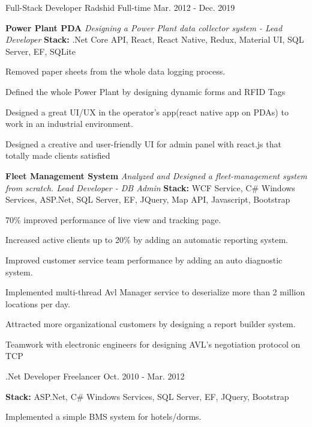 \begin{cventries}
\cventry
{Full-Stack Developer} %
{Radshid} %
{Full-time} %
{Mar. 2012 - Dec. 2019} %
{ %
\textcolor{awesome-red}{{\textbf{Power Plant PDA}}}
\break
{\it Designing a Power Plant data collector system - Lead Developer}
\break
{\textbf{ Stack:} }{.Net Core API, React, React Native, Redux, Material UI, SQL Server, EF, SQLite}
\break
\begin{cvitems}
\item {Removed paper sheets from the whole data logging process.}
\item {Defined the whole Power Plant by designing dynamic forms and RFID Tags}
\item {Designed a great UI/UX in the operator's app(react native app on PDAs) to work in an industrial environment.}
\item {Designed a creative and user-friendly UI for admin panel with react.js that totally made clients satisfied}
\end{cvitems}
\bigskip
\break
\bigskip
\textcolor{awesome-red}{{\textbf{Fleet Management System}}}
\break
{\it Analyzed and Designed a fleet-management system from scratch. Lead Developer - DB Admin}
\break
{\textbf{ Stack:} }{WCF Service, C\# Windows Services, ASP.Net, SQL Server, EF, JQuery, Map API, Javascript, Bootstrap}
\break
\begin{cvitems}
\item {70\% improved performance of live view and tracking page.}
\item {Increased active clients up to 20\% by adding an automatic reporting system.}
\item {Improved customer service team performance by adding an auto diagnostic system.}
\item {Implemented multi-thread Avl Manager service to deserialize more than 2 million locations per day.}
\item {Attracted more organizational customers by designing a report builder system.}
\item {Teamwork with electronic engineers for designing AVL's negotiation protocol on TCP}
\end{cvitems}
}



\cventry
{.Net Developer} %
{Freelancer} %
{} %
{Oct. 2010 - Mar. 2012} %
{ %
{\textbf{ Stack:} }{ASP.Net, C\# Windows Services, SQL Server, EF, JQuery, Bootstrap}
\break
\begin{cvitems}
\item {Implemented a simple BMS system for hotels/dorms.}
\end{cvitems} 
}


\end{cventries}
